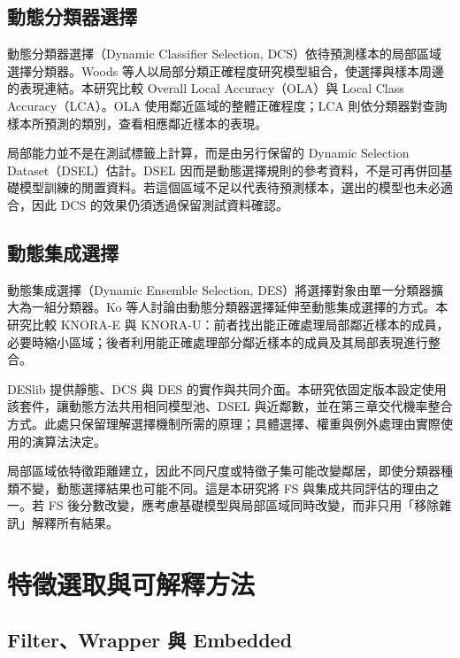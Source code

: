 \subsection{動態分類器選擇}

動態分類器選擇（Dynamic Classifier Selection, DCS）依待預測樣本的局部區域選擇分類器。Woods 等人\autocite{woods1997local}以局部分類正確程度研究模型組合，使選擇與樣本周邊的表現連結。本研究比較 Overall Local Accuracy（OLA）與 Local Class Accuracy（LCA）。OLA 使用鄰近區域的整體正確程度；LCA 則依分類器對查詢樣本所預測的類別，查看相應鄰近樣本的表現\autocite{deslib-ola-docs,deslib-lca-docs}。

局部能力並不是在測試標籤上計算，而是由另行保留的 Dynamic Selection Dataset（DSEL）估計。DSEL 因而是動態選擇規則的參考資料，不是可再併回基礎模型訓練的閒置資料。若這個區域不足以代表待預測樣本，選出的模型也未必適合，因此 DCS 的效果仍須透過保留測試資料確認。

\subsection{動態集成選擇}

動態集成選擇（Dynamic Ensemble Selection, DES）將選擇對象由單一分類器擴大為一組分類器。Ko 等人\autocite{ko2008dynamic}討論由動態分類器選擇延伸至動態集成選擇的方式。本研究比較 KNORA-E 與 KNORA-U：前者找出能正確處理局部鄰近樣本的成員，必要時縮小區域；後者利用能正確處理部分鄰近樣本的成員及其局部表現進行整合\autocite{deslib-knorae-docs,deslib-knorau-docs}。

DESlib 提供靜態、DCS 與 DES 的實作與共同介面\autocite{cruz2020deslib}。本研究依固定版本設定使用該套件，讓動態方法共用相同模型池、DSEL 與近鄰數，並在第三章交代機率整合方式。此處只保留理解選擇機制所需的原理；具體選擇、權重與例外處理由實際使用的演算法決定。

局部區域依特徵距離建立，因此不同尺度或特徵子集可能改變鄰居，即使分類器種類不變，動態選擇結果也可能不同。這是本研究將 FS 與集成共同評估的理由之一。若 FS 後分數改變，應考慮基礎模型與局部區域同時改變，而非只用「移除雜訊」解釋所有結果。

\section{特徵選取與可解釋方法}

\subsection{Filter、Wrapper 與 Embedded}

